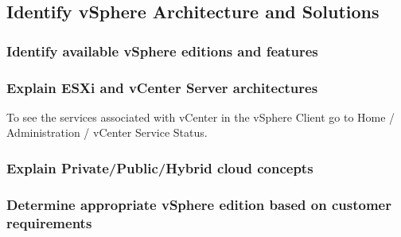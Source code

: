 \subsection{Identify vSphere Architecture and Solutions}

\subsubsection{Identify available vSphere editions and features}

\subsubsection{Explain ESXi and vCenter Server architectures}

To see the services associated with vCenter in the vSphere Client go to
Home / Administration / vCenter Service Status.

\subsubsection{Explain Private/Public/Hybrid cloud concepts}

\subsubsection{Determine appropriate vSphere edition based on customer requirements}
